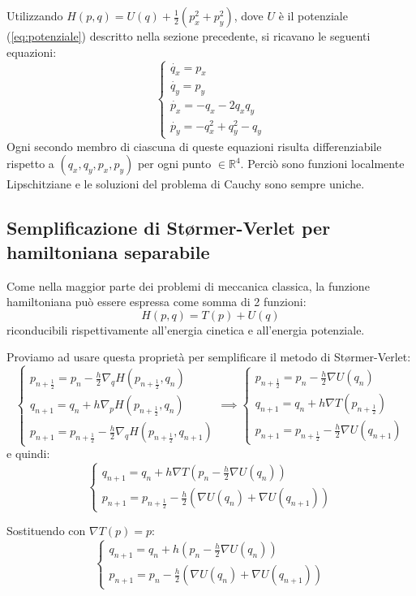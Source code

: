 \documentclass[a4paper]{article}
\numberwithin{equation}{section}
\numberwithin{figure}{section}
\begin{document}
Utilizzando $H(p,q) = U(q)+\frac{1}{2}(p_x^2+p_y^2)$, dove $U$ è il potenziale (\ref{eq:potenziale})
descritto nella sezione precedente, si ricavano le
seguenti equazioni:
$$
\begin{cases}
	\dot{q_x} = p_x\\
	\dot{q_y} = p_y\\
	\dot{p_x} = -q_x-2q_x q_y\\
	\dot{p_y} = -q_x^2 + q_y^2 - q_y
\end{cases}
$$
Ogni secondo membro di ciascuna di queste equazioni risulta differenziabile rispetto a
$(q_x,q_y,p_x,p_y)$ per ogni punto $\in \mathbb{R}^4$. Perciò sono funzioni localmente
Lipschitziane e le soluzioni del problema di Cauchy sono sempre uniche.

\subsection{Semplificazione di Størmer-Verlet per hamiltoniana separabile}
Come nella maggior parte dei problemi di meccanica classica, la funzione hamiltoniana
può essere espressa come somma di 2 funzioni:
\begin{equation}
	H(p,q) = T(p) + U(q)
\end{equation}
riconducibili rispettivamente all'energia cinetica e all'energia potenziale.

Proviamo ad usare questa proprietà per semplificare il metodo di Størmer-Verlet:
$$
\begin{cases}
	p_{n+\frac{1}{2}} = p_n - \frac{h}{2}\nabla_q H(p_{n+\frac{1}{2}},q_n)\\
	q_{n+1} = q_n + h \nabla_p H(p_{n+\frac{1}{2}}, q_n)\\
	p_{n+1} = p_{n+\frac{1}{2}} - \frac{h}{2} \nabla_q H(p_{n+\frac{1}{2}},q_{n+1})
\end{cases}
\implies
\begin{cases}
	p_{n+\frac{1}{2}} = p_n - \frac{h}{2}\nabla U(q_n)\\
	q_{n+1} = q_n + h \nabla T(p_{n+\frac{1}{2}})\\
	p_{n+1} = p_{n+\frac{1}{2}} - \frac{h}{2} \nabla U(q_{n+1})
\end{cases}
$$
e quindi:
$$
\begin{cases}
	q_{n+1} = q_n + h \nabla T(p_n - \frac{h}{2}\nabla U(q_n))\\
	p_{n+1} = p_{n+\frac{1}{2}} - \frac{h}{2} (\nabla U(q_n)+\nabla U(q_{n+1}))
\end{cases}
$$

Sostituendo con $\nabla T(p)=p$:
$$
\begin{cases}
	q_{n+1} = q_n + h(p_n-\frac{h}{2}\nabla U(q_n))\\
	p_{n+1} = p_n - \frac{h}{2} (\nabla U(q_n)+\nabla U(q_{n+1}))
\end{cases}
$$
\end{document}
